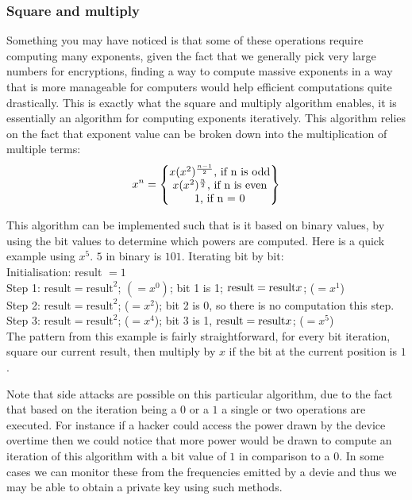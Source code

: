 \documentclass[conference]{IEEEtran}
\begin{document}
\subsubsection*{Square and multiply}
Something you may have noticed is that some of these operations require 
computing many exponents, given the fact that we generally pick very large 
numbers for encryptions, finding a way to compute massive exponents 
in a way that is more manageable for computers would help efficient computations 
quite drastically. This is exactly what the square and multiply algorithm
enables, it is essentially an algorithm for computing exponents iteratively.
This algorithm relies on the fact that exponent value can be broken down into
the multiplication of multiple terms:
\begin{equation*}
    x^{n} =    
    \begin{Bmatrix} 
        x\*(x^{2})^{\frac{n - 1}{2}} \textrm{, if n is odd} \\
        x\*(x^{2})^{\frac{n}{2}} \textrm{, if n is even} \\  
        1 \textrm{, if n = 0} \\  

     \end{Bmatrix}
\end{equation*}


This algorithm can be implemented such that is it based on 
binary values, by using the bit values to determine which 
powers are computed.
Here is a quick example using $x^5$. $5$ in binary is $101$.
Iterating bit by bit: \\
Initialisation: result $= 1$ \\
Step 1: $\textrm{result}=\textrm{result}^2$; $(= x^0)$; bit 1 is 1; $\textrm{result} = \textrm{result}\*x$; ($= x^1$) \\
Step 2: $\textrm{result}=\textrm{result}^2$; ($= x^2$); bit 2 is 0, so there is no computation this step. \\
Step 3: $\textrm{result}=\textrm{result}^2$; ($= x^4$); bit 3 is 1, $\textrm{result} = \textrm{result}\*x$; ($= x^5$) \\

The pattern from this example is fairly straightforward, for every bit iteration, 
square our current result, then multiply by $x$ if the bit at the current position is $1$.


Note that side attacks are possible on this particular algorithm, due to 
the fact that based on the iteration being a $0$ or a $1$ a single or two
operations are executed. For instance if a hacker could access the power drawn
by the device overtime then we could notice that more power would be drawn to
compute an iteration of this algorithm with a bit value of $1$ in comparison to 
a $0$. In some cases we can monitor these from the frequencies emitted by a devie
and thus we may be able to obtain a private key using such methods.
\end{document}
